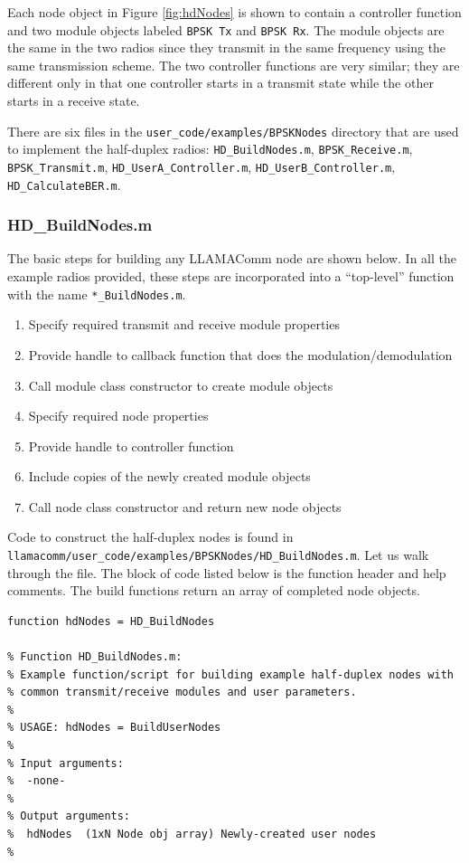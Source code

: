 Each node object in Figure \ref{fig:hdNodes} is shown to contain a
controller function and two module objects labeled \verb+BPSK Tx+
and \verb+BPSK Rx+.  The module objects are the same in the two
radios since they transmit in the same frequency using the same
transmission scheme. The two controller functions are very similar;
they are different only in that one controller starts in a transmit
state while the other starts in a receive state.

There are six files in the \verb+user_code/examples/BPSKNodes+ directory 
that are
used to implement the half-duplex radios: \verb+HD_BuildNodes.m+,
\verb+BPSK_Receive.m+, \verb+BPSK_Transmit.m+,
\verb+HD_UserA_Controller.m+, \verb+HD_UserB_Controller.m+,
\verb+HD_CalculateBER.m+.

\subsubsection{HD\_BuildNodes.m}

The basic steps for building any LLAMAComm node are shown below.  In
all the example radios provided, these steps are incorporated into a
``top-level'' function with the name \verb+*_BuildNodes.m+.

\begin{enumerate}
\item Specify required transmit and receive module properties
\item Provide handle to callback function that does the modulation/demodulation
\item Call module class constructor to create module objects
\item Specify required node properties
\item Provide handle to controller function
\item Include copies of the newly created module objects
\item Call node class constructor and return new node objects
\end{enumerate}

Code to construct the half-duplex nodes is found in
\verb+llamacomm/user_code/examples/BPSKNodes/HD_BuildNodes.m+.  
Let us walk through
the file.  The block of code listed below is the function header and
help comments. The build functions return an array of completed node
objects.

\begin{lstlisting}[name=hdBuildNodes]
function hdNodes = HD_BuildNodes

% Function HD_BuildNodes.m:
% Example function/script for building example half-duplex nodes with
% common transmit/receive modules and user parameters.
%
% USAGE: hdNodes = BuildUserNodes
%
% Input arguments:
%  -none-
%
% Output arguments:
%  hdNodes  (1xN Node obj array) Newly-created user nodes
%
\end{lstlisting}

